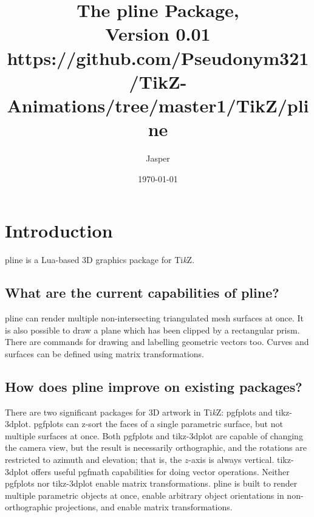\documentclass[12pt]{report}
\title{
    The pline Package,\\
    Version 0.01\\
    {\small https://github.com/Pseudonym321/TikZ-Animations/tree/master1/TikZ/pline}
}
\author{Jasper}
\date{\today}
\begin{document}
    \maketitle 
    \tableofcontents
    \chapter{Introduction}
        pline is a Lua-based 3D graphics package for 
        Ti\textit{k}Z.
        \section{What are the current capabilities of pline?}
            pline can render multiple non-intersecting 
            triangulated mesh surfaces at once. It is also possible 
            to draw a plane which has been clipped by a rectangular
            prism.
            There are commands for drawing and labelling geometric 
            vectors too. Curves and surfaces can be defined using 
            matrix transformations.
        \section{
            How does pline improve on existing packages?
        }
            There are two significant packages for 3D artwork in 
            Ti\textit{k}Z: pgfplots and tikz-3dplot.
            pgfplots can z-sort the faces of a single parametric 
            surface, but not multiple surfaces at once.
            Both pgfplots and tikz-3dplot are capable of changing 
            the camera view, but the result is necessarily 
            orthographic, and the rotations are restricted to 
            azimuth and elevation; that is, the \(z\)-axis is always 
            vertical. tikz-3dplot offers useful pgfmath capabilities 
            for doing vector operations.
            Neither pgfplots nor tikz-3dplot enable 
            matrix transformations. pline is built to render 
            multiple parametric objects at once, enable arbitrary
            object orientations in non-orthographic projections, 
            and enable matrix transformations.
\end{document}
